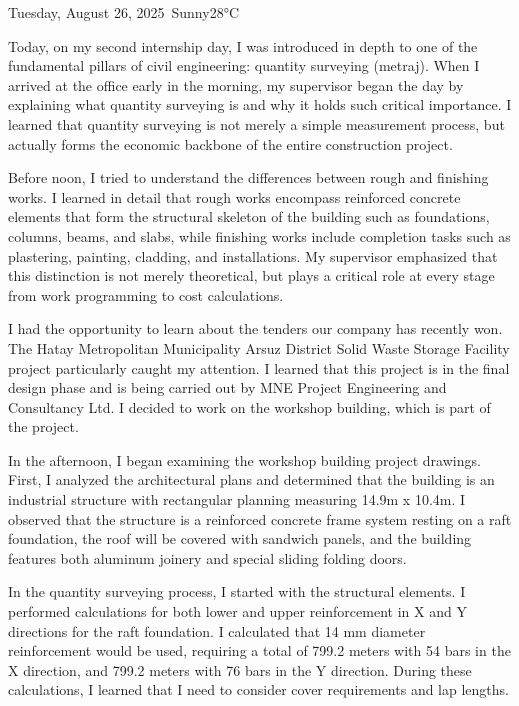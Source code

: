 \begin{dailyentry}{Tuesday, August 26, 2025}{\weathersunny\ Sunny}{28°C}

\begin{workcontent}
Today, on my second internship day, I was introduced in depth to one of the fundamental pillars of civil engineering: quantity surveying (metraj). When I arrived at the office early in the morning, my supervisor began the day by explaining what quantity surveying is and why it holds such critical importance. I learned that quantity surveying is not merely a simple measurement process, but actually forms the economic backbone of the entire construction project.

Before noon, I tried to understand the differences between rough and finishing works. I learned in detail that rough works encompass reinforced concrete elements that form the structural skeleton of the building such as foundations, columns, beams, and slabs, while finishing works include completion tasks such as plastering, painting, cladding, and installations. My supervisor emphasized that this distinction is not merely theoretical, but plays a critical role at every stage from work programming to cost calculations.

I had the opportunity to learn about the tenders our company has recently won. The Hatay Metropolitan Municipality Arsuz District Solid Waste Storage Facility project particularly caught my attention. I learned that this project is in the final design phase and is being carried out by MNE Project Engineering and Consultancy Ltd. I decided to work on the workshop building, which is part of the project.

In the afternoon, I began examining the workshop building project drawings. First, I analyzed the architectural plans and determined that the building is an industrial structure with rectangular planning measuring 14.9m x 10.4m. I observed that the structure is a reinforced concrete frame system resting on a raft foundation, the roof will be covered with sandwich panels, and the building features both aluminum joinery and special sliding folding doors.

In the quantity surveying process, I started with the structural elements. I performed calculations for both lower and upper reinforcement in X and Y directions for the raft foundation. I calculated that 14 mm diameter reinforcement would be used, requiring a total of 799.2 meters with 54 bars in the X direction, and 799.2 meters with 76 bars in the Y direction. During these calculations, I learned that I need to consider cover requirements and lap lengths.


\end{workcontent}
\end{dailyentry}
